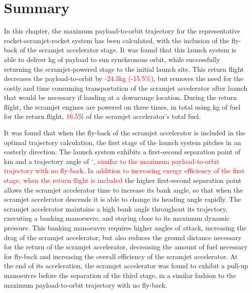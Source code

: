 \section{Summary}

In this chapter, the maximum payload-to-orbit trajectory for the representative rocket-scramjet-rocket system has been calculated, with the inclusion of the fly-back of the scramjet accelerator stage. It was found that this launch system is able to deliver \PayloadToOrbitStandard kg of payload to sun synchronous orbit, while successfully returning the scramjet-powered stage to the initial launch site. 
This return flight decreases the payload-to-orbit by \textcolor{red}{-24.3kg (-15.5\%)}, but removes the need for the costly and time consuming transportation of the scramjet accelerator after launch that would be necessary if landing at a downrange location.
During the return flight, the scramjet engines are powered on three times, in total using \returnFuelStandard kg of fuel for the return flight, \textcolor{red}{16.5}\% of the scramjet accelerator's total fuel.

It was found that when the fly-back of the scramjet accelerator is included in the optimal trajectory calculation, the first stage of the launch system pitches in an easterly direction. 
The launch system exhibits a first-second separation point of \firstsecondSeparationAltStandard km and a trajectory angle of \firstsecondSeparationgammaStandard $^\circ$, \textcolor{red}{similar to the maximum payload-to-orbit trajectory with no fly-back. 
In addition to increasing exergy efficiency of the first stage, when the return flight is included} the higher first-second separation point allows the scramjet accelerator time to increase its bank angle, so that when the scramjet accelerator descends it is able to change its heading angle rapidly. The scramjet accelerator maintains a high bank angle throughout its trajectory, executing a banking manoeuvre, and staying close to its maximum dynamic pressure. 
This banking manoeuvre requires higher angles of attack, increasing the drag of the scramjet accelerator, but also reduces the ground distance necessary for the return of the scramjet accelerator, decreasing the amount of fuel necessary for fly-back and increasing the overall efficiency of the scramjet accelerator. 
At the end of its acceleration, the scramjet accelerator was found to exhibit a pull-up manoeuvre before the separation of the third stage, in a similar fashion to the maximum payload-to-orbit trajectory with no fly-back. 

